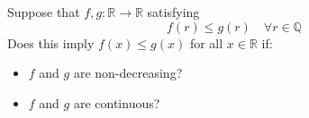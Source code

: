 Suppose that \(f,g\colon \mathbb{R}\to \mathbb{R}\) satisfying
\[ f(r)\le g(r)\quad \forall r\in \mathbb{Q} \]
Does this imply \(f(x)\le g(x)\) for all \(x\in \mathbb{R}\) if:
\begin{itemize}
  \item[(a)] \(f\) and \(g\) are non-decreasing?
  \item[(b)] \(f\) and \(g\) are continuous?
\end{itemize}
